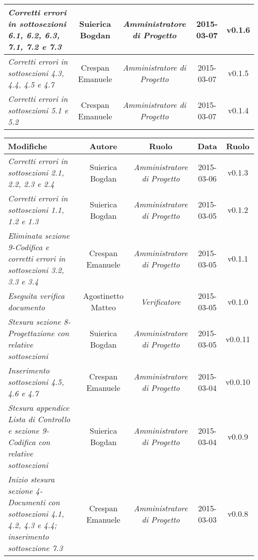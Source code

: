 \begin{table}[h]
\begin{tabular}{|p{}|c|c|c|c|}
	\midrule
		\textit{Corretti errori in sottosezioni 6.1, 6.2, 6.3, 7.1, 7.2 e 7.3} & Suierica Bogdan & \textit{Amministratore di Progetto} & 2015-03-07 & v0.1.6 \\
	\midrule
		\textit{Corretti errori in sottosezioni 4.3, 4.4, 4.5 e 4.7} & Crespan Emanuele & \textit{Amministratore di Progetto} & 2015-03-07 & v0.1.5 \\
    \midrule
	    \textit{Corretti errori in sottosezioni 5.1 e 5.2} & Crespan Emanuele & \textit{Amministratore di Progetto} & 2015-03-07 & v0.1.4 \\
	\bottomrule
\end{tabular}	
\end{table}
\newpage
\begin{table}[h]
\centering
\begin{tabular}{|p{}|c|c|c|c|}
	\toprule
	\textbf{Modifiche} & \textbf{Autore} & \textbf{Ruolo} & \textbf{Data} & \textbf{Ruolo} \\
	\midrule
	\midrule
		\textit{Corretti errori in sottosezioni 2.1, 2.2, 2.3 e 2.4} & Suierica Bogdan & \textit{Amministratore di Progetto} & 2015-03-06 & v0.1.3 \\
	\midrule
		\textit{Corretti errori in sottosezioni 1.1, 1.2 e 1.3} & Suierica Bogdan & \textit{Amministratore di Progetto} & 2015-03-05 & v0.1.2 \\
	\midrule
		\textit{Eliminata sezione 9-Codifica e corretti errori in sottosezioni 3.2, 3.3 e 3.4} & Crespan Emanuele & \textit{Amministratore di Progetto} & 2015-03-05 & v0.1.1 \\
	\midrule
		\textit{Eseguita verifica documento} & Agostinetto Matteo & \textit{Verificatore} & 2015-03-05 & v0.1.0 \\
	\midrule
		\textit{Stesura sezione 8-Progettazione con relative sottosezioni} & Suierica Bogdan & \textit{Amministratore di Progetto} & 2015-03-05 & v0.0.11 \\
	\midrule
		\textit{Inserimento sottosezioni 4.5, 4.6 e 4.7} & Crespan Emanuele & \textit{Amministratore di Progetto} & 2015-03-04 & v0.0.10 \\
	\midrule
		\textit{Stesura appendice Lista di Controllo e sezione 9-Codifica con relative sottosezioni} & Suierica Bogdan & \textit{Amministratore di Progetto} & 2015-03-04 & v0.0.9 \\
	\midrule
		\textit{Inizio stesura sezione 4-Documenti con sottosezioni 4.1, 4.2, 4.3 e 4.4; inserimento sottosezione 7.3} & Crespan Emanuele & \textit{Amministratore di Progetto} & 2015-03-03 & v0.0.8 \\

\end{tabular}
\end{table}
